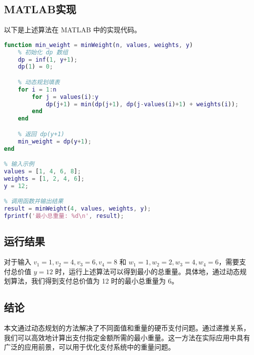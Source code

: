 \documentclass[12pt]{article}
\begin{document}
\subsection{MATLAB实现}
以下是上述算法在 MATLAB 中的实现代码。

\begin{lstlisting}[language=Matlab, caption=MATLAB代码]
function min_weight = minWeight(n, values, weights, y)
    % 初始化 dp 数组
    dp = inf(1, y+1);
    dp(1) = 0;

    % 动态规划填表
    for i = 1:n
        for j = values(i):y
            dp(j+1) = min(dp(j+1), dp(j-values(i)+1) + weights(i));
        end
    end

    % 返回 dp(y+1)
    min_weight = dp(y+1);
end

% 输入示例
values = [1, 4, 6, 8];
weights = [1, 2, 4, 6];
y = 12;

% 调用函数并输出结果
result = minWeight(4, values, weights, y);
fprintf('最小总重量: %d\n', result);
\end{lstlisting}

\subsection{运行结果}
对于输入 $v_1 = 1, v_2 = 4, v_3 = 6, v_4 = 8$ 和 $w_1 = 1, w_2 = 2, w_3 = 4, w_4 = 6$，需要支付总价值 $y = 12$ 时，运行上述算法可以得到最小的总重量。具体地，通过动态规划算法，我们得到支付总价值为 12 时的最小总重量为 6。

\subsection{结论}
本文通过动态规划的方法解决了不同面值和重量的硬币支付问题。通过递推关系，我们可以高效地计算出支付指定金额所需的最小重量。这一方法在实际应用中具有广泛的应用前景，可以用于优化支付系统中的重量问题。
\end{document}
